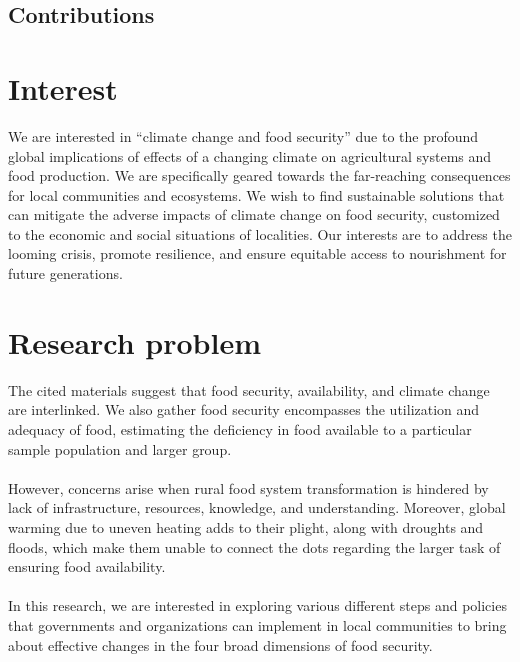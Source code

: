 \documentclass[12pt, twoside]{report}
\title{}
\author{Riddhiman}
\date{\monthyeardate\today}
\begin{document}



\begin{center}
    \section*{Contributions}%
    
\end{center}


\newpage 

\begin{multicols}{2}
\section*{Interest}
We are interested in “climate change and food security” due to the profound global implications of effects of a changing climate on agricultural systems and food production. We are specifically geared towards the far-reaching consequences for local communities and ecosystems. We wish to find sustainable solutions that can mitigate the adverse impacts of climate change on food security, customized to the economic and social situations of localities. Our interests are to address the looming crisis, promote resilience, and ensure equitable access to nourishment for future generations.


\section*{Research problem}
The cited materials suggest that food security, availability, and climate change are interlinked. We also gather food security encompasses the utilization and adequacy of food, estimating the deficiency in food available to a particular sample population and larger group. \\ \\ 
However, concerns arise when rural food system transformation is hindered by lack of infrastructure, resources, knowledge, and understanding. Moreover, global warming due to uneven heating adds to their plight, along with droughts and floods, which make them unable to connect the dots regarding the larger task of ensuring food availability. \\ \\
In this research, we are interested in exploring various different steps and policies that governments and organizations can implement in local communities to bring about effective changes in the four broad dimensions of food security.



\end{multicols}
\end{document}

